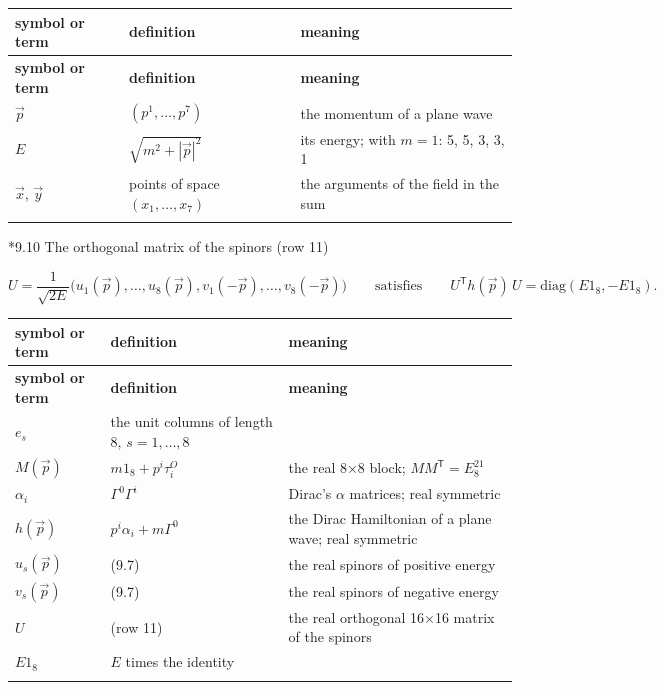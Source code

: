 \documentclass[10pt,a4paper]{article}
\makeatletter
\renewcommand\subsection{\@startsection{subsection}{2}{\z@}{-3.25ex\@plus -1ex \@minus -.2ex}{1.5ex \@plus .2ex}{\normalfont\large\bfseries\raggedright}}
\makeatother
\begin{document}
{\footnotesize
\begin{longtable}{>{\raggedright\arraybackslash}p{}>{\raggedright\arraybackslash}p{}>{\raggedright\arraybackslash}p{}}
\toprule
\textbf{symbol or term} & \textbf{definition} & \textbf{meaning} \\
\midrule\endfirsthead
\toprule
\textbf{symbol or term} & \textbf{definition} & \textbf{meaning} \\
\midrule\endhead
\endfoot
\bottomrule\endlastfoot
$\vec p$ & $(p^1,\dots,p^7)$ & the momentum of a plane wave \\
$E$ & $\sqrt{m^2+|\vec p|^2}$ & its energy; with $m=1$: 5, 5, 3, 3, 1 \\
$\vec x$, $\vec y$ & points of space $(x_1,\dots,x_7)$ & the arguments of the field in the sum \\*
\end{longtable}}
\subsection*{9.10 The orthogonal matrix of the spinors (row 11)}
\begin{equation*}
U=\frac1{\sqrt{2E}}\big(u_1(\vec p),\dots,u_8(\vec p),v_1(-\vec p),\dots,v_8(-\vec p)\big)\qquad\text{satisfies}\qquad U^{\mathsf T}h(\vec p)\,U=\mathrm{diag}(E1_8,-E1_8).
\end{equation*}
{\footnotesize
\begin{longtable}{>{\raggedright\arraybackslash}p{}>{\raggedright\arraybackslash}p{}>{\raggedright\arraybackslash}p{}}
\toprule
\textbf{symbol or term} & \textbf{definition} & \textbf{meaning} \\
\midrule\endfirsthead
\toprule
\textbf{symbol or term} & \textbf{definition} & \textbf{meaning} \\
\midrule\endhead
\endfoot
\bottomrule\endlastfoot
$e_s$ & the unit columns of length 8, $s=1,\dots,8$ &  \\
$M(\vec p)$ & $m1_8+p^i\tau^O_i$ & the real 8×8 block; $MM^{\mathsf T}=E^21_8$ \\
$\alpha_i$ & $\Gamma^0\Gamma^i$ & Dirac’s $\alpha$ matrices; real symmetric \\
$h(\vec p)$ & $p^i\alpha_i+m\Gamma^0$ & the Dirac Hamiltonian of a plane wave; real symmetric \\
$u_s(\vec p)$ & (9.7) & the real spinors of positive energy \\
$v_s(\vec p)$ & (9.7) & the real spinors of negative energy \\
$U$ & (row 11) & the real orthogonal 16×16 matrix of the spinors \\
$E1_8$ & $E$ times the identity &  \\*
\end{longtable}}
\end{document}
